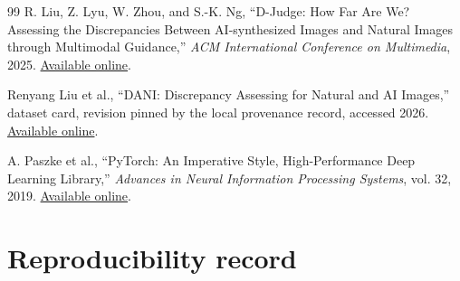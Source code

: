 \documentclass[12pt,a4paper]{article}
\begin{document}
\begin{thebibliography}{99}
R. Liu, Z. Lyu, W. Zhou, and S.-K. Ng,
``D-Judge: How Far Are We? Assessing the Discrepancies Between AI-synthesized Images and Natural
Images through Multimodal Guidance,'' \emph{ACM International Conference on Multimedia}, 2025.
\href{https://arxiv.org/abs/2412.17632}{Available online}.

Renyang Liu et al., ``DANI: Discrepancy Assessing for Natural and AI Images,'' dataset card,
revision pinned by the local provenance record, accessed 2026.
\href{https://huggingface.co/datasets/Renyang/DANI}{Available online}.

A. Paszke et al., ``PyTorch: An Imperative Style, High-Performance Deep Learning Library,''
\emph{Advances in Neural Information Processing Systems}, vol. 32, 2019.
\href{https://papers.neurips.cc/paper/9015-pytorch-an-imperative-style-high-performance-deep-learning-library}{Available online}.

\end{thebibliography}

\clearpage
\appendix
\section{Reproducibility record}
\end{document}
